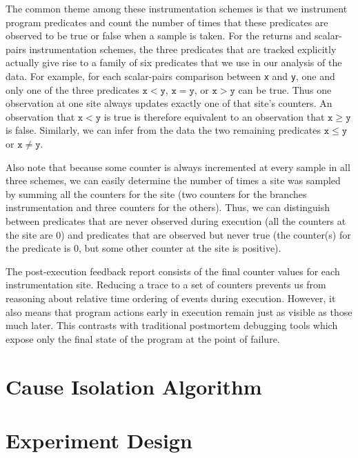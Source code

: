 \documentclass{sig-alternate}
\begin{document}
The common theme among these instrumentation schemes is that we
instrument program predicates and count the number of times that these
predicates are observed to be true or false when a sample is taken.
For the returns and scalar-pairs instrumentation schemes, the three
predicates that are tracked explicitly actually give rise to a family
of six predicates that we use in our analysis of the data.
For example, for each scalar-pairs comparison between \texttt{x} and \texttt{y}, one and
only one of the three predicates $\mathtt{x} < \mathtt{y}$, $\mathtt{x} = \mathtt{y}$, or
$\mathtt{x} > \mathtt{y}$ can be true.  Thus one observation at one
site always updates exactly one of that site's counters.  An
observation that $\mathtt{x} < \mathtt{y}$ is true is therefore equivalent to
an observation that $\mathtt{x} \geq \mathtt{y}$ is false.  Similarly, we can
infer from the data the two remaining predicates $\mathtt{x} \leq \mathtt{y}$ or
$\mathtt{x} \neq \mathtt{y}$.

Also note that because some counter is always incremented at every
sample in all three schemes, we can easily determine the number of
times a site was sampled by summing all the counters for the site
(two counters for the branches instrumentation and three counters for
the others).  Thus, we can distinguish between predicates that are
never observed during execution (all the counters at the site are 0)
and predicates that are observed but never true (the counter(s) for the predicate
is 0, but some other counter at the site is positive).

The post-execution feedback report consists of the final counter values for
each instrumentation site.  Reducing a trace to a set of counters
prevents us from reasoning about relative time ordering of events
during execution.  However, it also means that program actions early
in execution remain just as visible as those much later.  This
contrasts with traditional postmortem debugging tools which expose
only the final state of the program at the point of failure.

\section{Cause Isolation Algorithm}
\label{sec:algorithm}


\section{Experiment Design}
\label{sec:experiments:setup}

\end{document}
